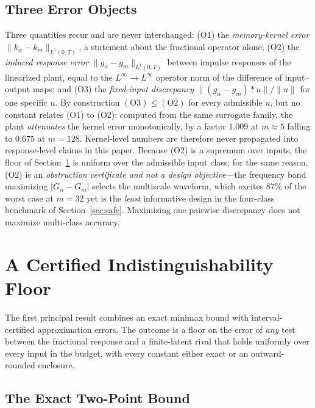 \documentclass[mathematics,article,accept,pdftex,moreauthors]{Definitions/mdpi}
\begin{document}
\subsection{Three Error Objects}
\label{sec:semantics}

Three quantities recur and are never interchanged: (O1) the \emph{memory-kernel error} $\|k_{\alpha}-k_{m}\|_{L^{1}(0,T)}$, a statement about the fractional operator alone; (O2) the \emph{induced response error} $\|g_{\alpha}-g_{m}\|_{L^{1}(0,T)}$ between impulse responses of the linearized plant, equal to the $L^{\infty}\!\to\!L^{\infty}$ operator norm of the difference of input--output maps; and (O3) the \emph{fixed-input discrepancy} $\|(g_{\alpha}-g_{m})*u\|/\|u\|$ for one specific $u$. By construction $\mathrm{(O3)}\le\mathrm{(O2)}$ for every admissible $u$, but no constant relates (O1) to (O2): computed from the same surrogate family, the plant \emph{attenuates} the kernel error monotonically, by a factor $1.009$ at $m\approx5$ falling to $0.675$ at $m=128$. Kernel-level numbers are therefore never propagated into response-level claims in this paper. Because (O2) is a supremum over inputs, the floor of Section~\ref{sec:floor} is uniform over the admissible input class; for the same reason, (O2) is an \emph{obstruction certificate and not a design objective}---the frequency band maximizing $|G_{\alpha}-G_{m}|$ selects the multiscale waveform, which excites $87\%$ of the worst case at $m=32$ yet is the \emph{least} informative design in the four-class benchmark of Section~\ref{sec:safe}. Maximizing one pairwise discrepancy does not maximize multi-class accuracy.

\section{A Certified Indistinguishability Floor}
\label{sec:floor}

The first principal result combines an exact minimax bound with interval-certified approximation errors. The outcome is a floor on the error of \emph{any} test between the fractional response and a finite-latent rival that holds uniformly over every input in the budget, with every constant either exact or an outward-rounded enclosure.

\subsection{The Exact Two-Point Bound}
\end{document}
